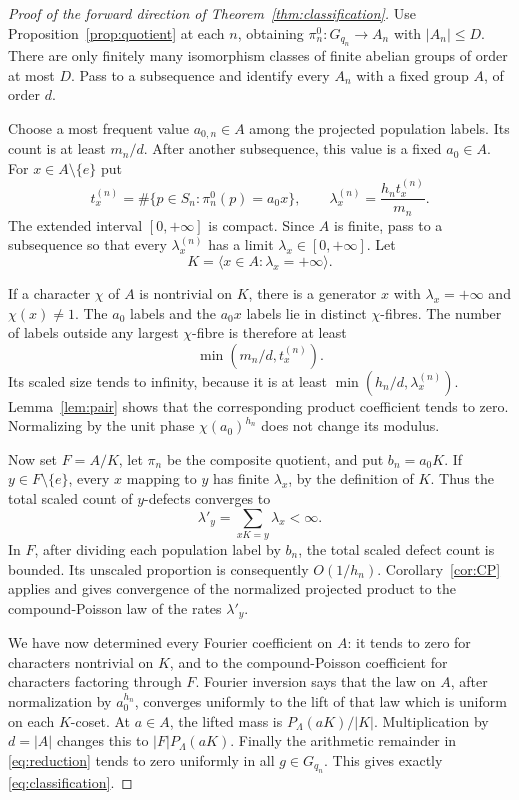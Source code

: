\documentclass[11pt]{article}
\theoremstyle{remark}\newtheorem{remark}[theorem]{Remark}
\begin{document}
\begin{proof}[Proof of the forward direction of Theorem~\ref{thm:classification}]
Use Proposition~\ref{prop:quotient} at each $n$, obtaining $\pi_n^0:G_{q_n}\to A_n$ with $|A_n|\le D$. There are only finitely many isomorphism classes of finite abelian groups of order at most $D$. Pass to a subsequence and identify every $A_n$ with a fixed group $A$, of order $d$.

Choose a most frequent value $a_{0,n}\in A$ among the projected population labels. Its count is at least $m_n/d$. After another subsequence, this value is a fixed $a_0\in A$. For $x\in A\setminus\{e\}$ put
\[
 t_x^{(n)}=\#\{p\in S_n:\pi_n^0(p)=a_0x\},\qquad
 \lambda_x^{(n)}=\frac{h_n t_x^{(n)}}{m_n}.
\]
The extended interval $[0,+\infty]$ is compact. Since $A$ is finite, pass to a subsequence so that every $\lambda_x^{(n)}$ has a limit $\lambda_x\in[0,+\infty]$. Let
\[
 K=\langle x\in A:\lambda_x=+\infty\rangle.
\]

If a character $\chi$ of $A$ is nontrivial on $K$, there is a generator $x$ with $\lambda_x=+\infty$ and $\chi(x)\ne1$. The $a_0$ labels and the $a_0x$ labels lie in distinct $\chi$-fibres. The number of labels outside any largest $\chi$-fibre is therefore at least
\[
 \min(m_n/d,t_x^{(n)}).
\]
Its scaled size tends to infinity, because it is at least
$\min(h_n/d,\lambda_x^{(n)})$. Lemma~\ref{lem:pair} shows that the corresponding product coefficient tends to zero. Normalizing by the unit phase $\chi(a_0)^{h_n}$ does not change its modulus.

Now set $F=A/K$, let $\pi_n$ be the composite quotient, and put $b_n=a_0K$. If $y\in F\setminus\{e\}$, every $x$ mapping to $y$ has finite $\lambda_x$, by the definition of $K$. Thus the total scaled count of $y$-defects converges to
\[
 \lambda'_y=\sum_{xK=y}\lambda_x<\infty.
\]
In $F$, after dividing each population label by $b_n$, the total scaled defect count is bounded. Its unscaled proportion is consequently $O(1/h_n)$. Corollary~\ref{cor:CP} applies and gives convergence of the normalized projected product to the compound-Poisson law of the rates $\lambda'_y$.

We have now determined every Fourier coefficient on $A$: it tends to zero for characters nontrivial on $K$, and to the compound-Poisson coefficient for characters factoring through $F$. Fourier inversion says that the law on $A$, after normalization by $a_0^{h_n}$, converges uniformly to the lift of that law which is uniform on each $K$-coset. At $a\in A$, the lifted mass is $P_\Lambda(aK)/|K|$. Multiplication by $d=|A|$ changes this to $|F|P_\Lambda(aK)$. Finally the arithmetic remainder in \eqref{eq:reduction} tends to zero uniformly in all $g\in G_{q_n}$. This gives exactly \eqref{eq:classification}.
\end{proof}
\end{document}
